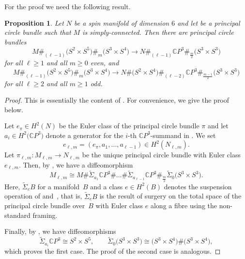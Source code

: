 \documentclass[pdftex]{sigma}
\numberwithin{equation}{section}
\newtheorem{Proposition}[Theorem]{Proposition}
\theoremstyle{definition}
\numberwithin{table}{section}
\newcommand{\C}{\mathbb{C}}
\begin{document}
For the proof we need the following result.
\begin{Proposition}\label{P:tw_susp}
	Let $N$ be a spin manifold of dimension $6$ and let  be a principal circle bundle such that $M$ is simply-connected. Then there are principal circle bundles
	\[ M\#_{(\ell-1)}\bigl(S^2\times S^5\bigr)\#_m\bigl(S^3\times S^4\bigr)\to N\#_{(\ell-1)}\C P^3\#_{\frac{m}{2}}\bigl(S^3\times S^3\bigr) \]
	for all $\ell\geq 1$ and all $m\geq 0$ even, and
	\[ M\#_{(\ell-1)}\bigl(S^2\times S^5\bigr)\#_m\bigl(S^3\times S^4\bigr)\to N\#\bigl(S^2\times S^4\bigr)\#_{(\ell-2)}\C P^3\#_{\frac{m-1}{2}}\bigl(S^3\times S^3\bigr) \]
	for all $\ell\geq 2$ and all $m\geq 1$ odd.
\end{Proposition}
\begin{proof}
	This is essentially the content of \cite[Lemma~11]{Xu25}. For convenience, we give the proof below.
	
	Let $e_\pi\in H^2(N)$ be the Euler class of the principal circle bundle $\pi$ and let $a_i\in H^2\bigl(\C P^3\bigr)$ denote a generator for the $i$-th $\C P^3$-summand in \smash{$N_{\ell,m}=N\#_{(\ell-1)}\C P^3\#_{\frac{m}{2}}\bigl(S^3\times S^3\bigr)$}. We set
	\[ e_{\ell,m}=(e_\pi,a_1,\dots,a_{\ell-1})\in H^2(N_{\ell,m}). \]
	Let $\pi_{\ell,m}\colon M_{\ell,m}\to N_{\ell,m}$ be the unique principal circle bundle with Euler class $e_{\ell,m}$. Then, by \cite[Theorem A]{GR25}, we have a diffeomorphism
	\[ M_{\ell,m}\cong M\#\widetilde{\Sigma}_{a_1}\C P^3\#\dots\#\widetilde{\Sigma}_{a_{\ell-1}}\C P^3\#_{\frac{m}{2}}\widetilde{\Sigma}_0 \bigl(S^3\times S^3\bigr).  \]
	Here, $\widetilde{\Sigma}_e B$ for a manifold~$B$ and a class $e\in H^2(B)$ denotes the suspension operation of \cite{Du26} and~\cite{GR25}, that is, $\widetilde{\Sigma}_e B$ is the result of surgery on the total space of the principal circle bundle over~$B$ with Euler class $e$ along a fibre using the non-standard framing.
	
	Finally, by \cite[Theorem B]{GR25}, we have diffeomorphisms
	\[ \widetilde{\Sigma}_{a_i}\C P^3\cong S^2\times S^5,\qquad \widetilde{\Sigma}_0\bigl(S^3\times S^3\bigr)\cong \bigl(S^3\times S^4\bigr)\#\bigl(S^3\times S^4\bigr), \]
	which proves the first case. The proof of the second case is analogous.
\end{proof}
\end{document}
